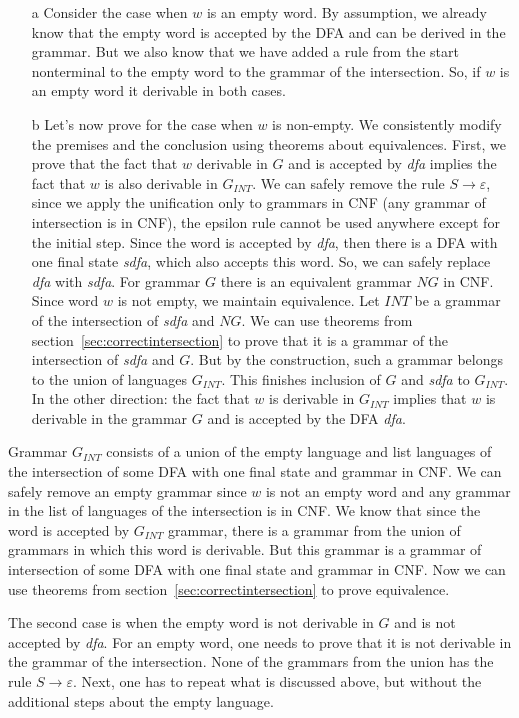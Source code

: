 \begin{enumerate}
\item[a] Consider the case when $w$ is an empty word.
By assumption, we already know that the empty word is accepted by the DFA and can be derived in the grammar. But we also know that we have added a rule from the start nonterminal to the empty word to the grammar of the intersection. So, if $w$ is an empty word it derivable in both cases.
\item[b] Let's now prove for the case when $w$ is non-empty.
We consistently modify the premises and the conclusion using theorems about equivalences. First, we prove that the fact that $w$ derivable in $G$ and is accepted by \textit{dfa} implies the fact that $w$ is also derivable in $G_{INT}$. We can safely remove the rule $S \to \varepsilon$, since we apply the unification only to grammars in CNF (any grammar of intersection is in CNF), the epsilon rule cannot be used anywhere except for the initial step.
Since the word is accepted by \textit{dfa}, then there is a DFA with one final state \textit{sdfa}, which also accepts this word. So, we can safely replace \textit{dfa} with \textit{sdfa}. 
For grammar $G$ there is an equivalent grammar $NG$ in CNF. Since word $w$ is not empty, we maintain equivalence.
Let $INT$ be a grammar of the intersection of \textit{sdfa} and $NG$. We can use theorems from section~\ref{sec:correctintersection} to prove that it is a grammar of the intersection of \textit{sdfa} and $G$. 
But by the construction, such a grammar belongs to the union of languages $G_{INT}$. This finishes inclusion of $G$ and \textit{sdfa} to $G_{INT}$.
In the other direction: the fact that $w$ is derivable in $G_{INT}$ implies that $w$ is derivable in the grammar $G$ and is accepted by the DFA \textit{dfa}. 
\end{enumerate}

Grammar $G_{INT}$ consists of a union of the empty language and list languages of the intersection of some DFA with one final state and grammar in CNF. We can safely remove an empty grammar since $w$ is not an empty word and any grammar in the list of languages of the intersection is in CNF.
We know that since the word is accepted by $G_{INT}$ grammar, there is a grammar from the union of grammars in which this word is derivable.
But this grammar is a grammar of intersection of some DFA with one final state and grammar in CNF. Now we can use theorems from section~\ref{sec:correctintersection} to prove equivalence.

The second case is when the empty word is not derivable in $G$ and is not accepted by \textit{dfa}.
For an empty word, one needs to prove that it is not derivable in the grammar of the intersection. 
None of the grammars from the union has the rule $S \to \varepsilon$. 
Next, one has to repeat what is discussed above, but without the additional steps about the empty language.
 	
